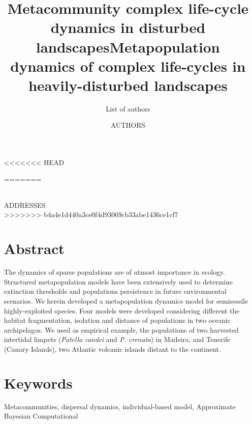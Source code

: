 \documentclass[12pt]{article}
\date{}
\begin{document}
<<<<<<< HEAD
\title{Metacommunity complex life-cycle dynamics in disturbed landscapes}
\author{List of authors}


\maketitle

=======
\begin{flushleft}
\title{Metapopulation dynamics of complex life-cycles in heavily-disturbed landscapes}
\maketitle
\author{AUTHORS}
\\
\small{ADDRESSES}
\\
\doublespacing
>>>>>>> b4a4e1d440a3ce0f4d93069cb33abe1436ce1cf7
\section{Abstract}
The dynamics of sparse populations are of utmost importance in
ecology. Structured metapopulation models have been extensively used
to determine extinction thresholds and populations persistence in
future environmental scenarios. We herein developed a metapopulation
dynamics model for semisessile highly-exploited species. Four models
were developed considering different the habitat fragmentation,
isolation and distance of populations in two oceanic archipelagos. We
used as empirical example, the populations of two harvested intertidal
limpets (\textit{Patella candei} and \textit{P. crenata}) in Madeira,
and Tenerife (Canary Islands), two Atlantic volcanic islands distant
to the continent.

\section{Keywords}
Metacommunities, dispersal dynamics, individual-based model, Approximate Bayesian Computational


\end{flushleft}
\end{document}
